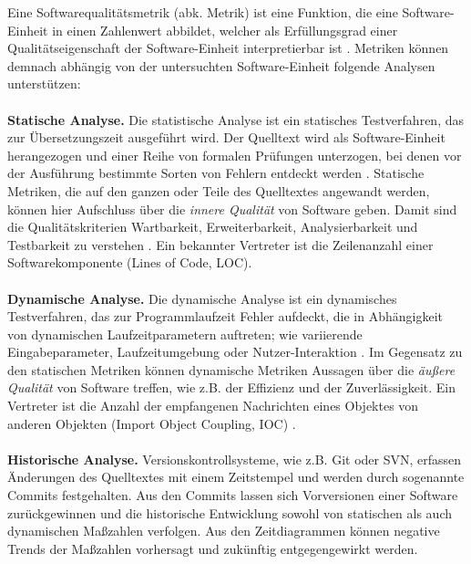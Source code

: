 \documentclass[12pt]{article}
\begin{document}
Eine Softwarequalitätsmetrik (abk. Metrik) ist eine Funktion, die
eine Software-Einheit in einen Zahlenwert abbildet, welcher als
Erfüllungsgrad einer Qualitätseigenschaft der Software-Einheit
interpretierbar ist \cite{Wik18a}. 
Metriken können demnach abhängig von der untersuchten
Software-Einheit folgende Analysen unterstützen:
\\
\\
\textbf{Statische Analyse.} Die statistische Analyse ist ein
statisches Testverfahren, das zur Übersetzungszeit ausgeführt
wird. Der Quelltext wird als Software-Einheit herangezogen und
einer Reihe von formalen Prüfungen unterzogen, bei denen vor der
Ausführung bestimmte Sorten von Fehlern entdeckt werden \cite{Wik18b}.
Statische Metriken, die auf den ganzen oder Teile des Quelltextes
angewandt werden, können hier Aufschluss über die \textit{innere
Qualität} von Software geben. Damit sind die Qualitätskriterien
Wartbarkeit, Erweiterbarkeit, Analysierbarkeit und Testbarkeit zu
verstehen \cite[4]{Gru17}. Ein bekannter Vertreter ist die
Zeilenanzahl einer Softwarekomponente (Lines of Code, LOC).
\\
\\
\textbf{Dynamische Analyse.} Die dynamische Analyse ist ein
dynamisches Testverfahren, das zur Programmlaufzeit Fehler aufdeckt, die
in Abhängigkeit von dynamischen Laufzeitparametern auftreten; wie
variierende Eingabeparameter, Laufzeitumgebung oder
Nutzer-Interaktion \cite{Wik18c}. Im Gegensatz zu den statischen
Metriken können dynamische Metriken Aussagen über die
\textit{äußere Qualität} von Software treffen, wie z.B. der
Effizienz und der Zuverlässigkeit. Ein Vertreter ist die Anzahl
der empfangenen Nachrichten eines Objektes von anderen Objekten
(Import Object Coupling, IOC) \cite{Chh10+}.
\\
\\
\textbf{Historische Analyse.} 
Versionskontrollsysteme, wie z.B. Git oder SVN, erfassen Änderungen
des Quelltextes mit einem Zeitstempel und werden durch sogenannte Commits
festgehalten. Aus
den Commits lassen sich Vorversionen einer Software
zurückgewinnen und die historische Entwicklung sowohl von
statischen als auch dynamischen Maßzahlen verfolgen.  Aus den
Zeitdiagrammen können negative Trends der Maßzahlen vorhersagt
und zukünftig entgegengewirkt werden.
\end{document}
